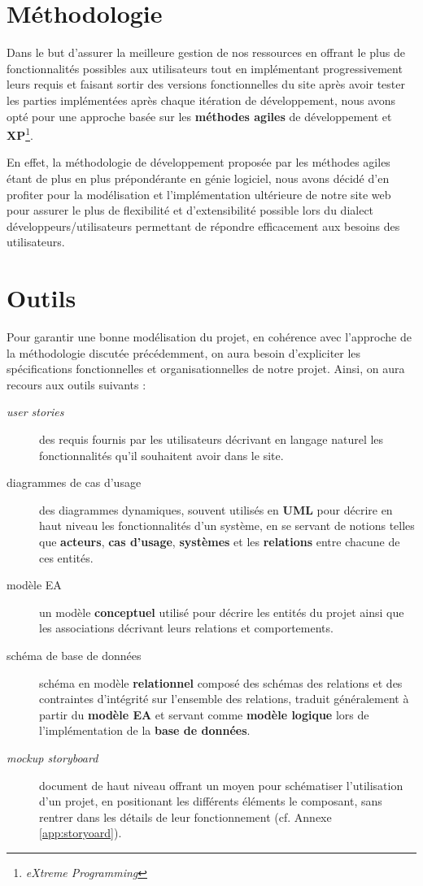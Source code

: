 \documentclass[a4paper,12pt]{book}
\theoremstyle{break}
\theoremstyle{break}
\theoremstyle{break}
\theoremstyle{break}
\theoremstyle{definition}
\theoremstyle{remark}
\begin{document}
\section{Méthodologie}
Dans le but d'assurer la meilleure gestion de nos ressources en offrant le plus de fonctionnalités possibles aux utilisateurs tout en implémentant progressivement leurs requis et faisant sortir des versions fonctionnelles du site après avoir tester les parties implémentées après chaque itération de développement, nous avons opté pour une approche basée sur les \textbf{méthodes agiles} de développement et \textbf{XP}\footnote{\textit{eXtreme Programming}}.

En effet, la méthodologie de développement proposée par les méthodes agiles étant de plus en plus prépondérante en génie logiciel, nous avons décidé d'en profiter pour la modélisation et l'implémentation ultérieure de notre site web pour assurer le plus de flexibilité et d'extensibilité possible lors du dialect développeurs/utilisateurs permettant de répondre efficacement aux besoins des utilisateurs.
\section{Outils}
Pour garantir une bonne modélisation du projet, en cohérence avec l'approche de la méthodologie discutée précédemment, on aura besoin d'expliciter les spécifications fonctionnelles et organisationnelles de notre projet. Ainsi, on aura recours aux outils suivants :
\begin{description}
  \item[\textit{user stories}]{des requis fournis par les utilisateurs décrivant en langage naturel les fonctionnalités qu'il souhaitent avoir dans le site.}
  \item[diagrammes de cas d'usage]{des diagrammes dynamiques, souvent utilisés en \textbf{UML} pour décrire en haut niveau les fonctionnalités d'un système, en se servant de notions telles que \textbf{acteurs}, \textbf{cas d'usage}, \textbf{systèmes} et les \textbf{relations} entre chacune de ces entités.}
  \item[modèle EA]{un modèle \textbf{conceptuel} utilisé pour décrire les entités du projet ainsi que les associations décrivant leurs relations et comportements.}
  \item[schéma de base de données]{schéma en modèle \textbf{relationnel} composé des schémas des relations et des contraintes d'intégrité sur l'ensemble des relations, traduit généralement à partir du \textbf{modèle EA} et servant comme \textbf{modèle logique} lors de l'implémentation de la \textbf{base de données}.}
  \item[\textit{mockup storyboard}]{document de haut niveau offrant un moyen pour schématiser l'utilisation d'un projet, en positionant les différents éléments le composant, sans rentrer dans les détails de leur fonctionnement (cf. Annexe \ref{app:storyoard}).}
\end{description}
\end{document}
